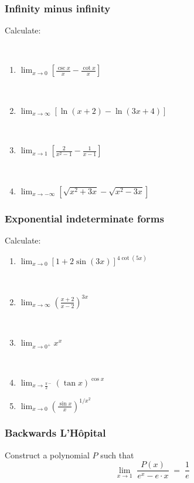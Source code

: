 \documentclass[14pt]{beamer}
\newcommand {\DS} [1] {${\displaystyle #1}$}
\begin{document}
\begin{frame}[t]
\frametitle{Infinity minus infinity}

Calculate:

\
\begin{enumerate}
	\item  \DS{\lim_{x \to 0} \left[ \frac{\csc x}{x} - \frac{\cot x}{x} \right] }

\	
	\item  \DS{\lim_{x \to \infty} \left[ \ln (x+2) - \ln(3x+4) \right] }

\	
	\item  \DS{\lim_{x \to 1} \left[ \frac{2}{x^2-1} - \frac{1}{x-1} \right]}

\
	
	\item  \DS{\lim_{x \to - \infty}  \left[ \sqrt{x^2+3x} - \sqrt{x^2-3x}  \right]}
\end{enumerate}


\end{frame}
\begin{frame}[t]
\frametitle{Exponential indeterminate forms}

Calculate:

\begin{enumerate}	
	\item   \DS{\lim_{x \to 0} \left[ 1 + 2 \sin(3x) \right]^{4 \cot (5x)} } 

	\
	\item  \DS{\lim_{x \to \infty } \left( \frac{x+2}{x-2} \right)^{3x}} 

	\
	\item  \DS{\lim_{x \to 0^+} x^x  }

	\
	\item  \DS{\lim_{x \to {\frac{\pi}{2}}^{-}} \left( \tan x \right)^{\cos x} } 
	
	\item \DS{\lim_{x \to 0} \left( \frac{\sin x}{x} \right)^{1 /x^2} }
\end{enumerate}

\end{frame}
\begin{frame}[t]
\frametitle{Backwards L'H\^{o}pital}


 Construct a polynomial $P$ such that
		$$
			\lim_{x \to 1} \; \frac{P(x)}{e^x - e \cdot x} \; = \; \frac{1}{e}
		$$

\end{frame}
\end{document}
